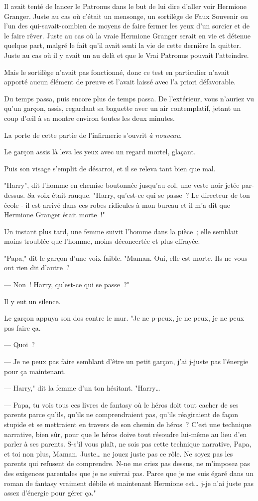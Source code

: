 Il avait tenté de lancer le Patronus dans le but de lui dire d'aller voir Hermione Granger. Juste au cas où c'était un mensonge, un sortilège de Faux Souvenir ou l'un des qui-savait-combien de moyens de faire fermer les yeux d'un sorcier et de le faire rêver. Juste au cas où la vraie Hermione Granger serait en vie et détenue quelque part, malgré le fait qu'il avait senti la vie de cette dernière la quitter. Juste au cas où il y avait un au delà et que le Vrai Patronus pouvait l'atteindre.

Mais le sortilège n'avait pas fonctionné, donc ce test en particulier n'avait apporté aucun élément de preuve et l'avait laissé avec l'a priori défavorable.

Du temps passa, puis encore plus de temps passa. De l'extérieur, vous n'auriez vu qu'un garçon, assis, regardant sa baguette avec un air contemplatif, jetant un coup d'œil à sa montre environ toutes les deux minutes.

La porte de cette partie de l'infirmerie s'ouvrit \emph{à nouveau}.

Le garçon assis là leva les yeux avec un regard mortel, glaçant.

Puis son visage s'emplit de désarroi, et il se releva tant bien que mal.

"Harry", dit l'homme en chemise boutonnée jusqu'au col, une veste noir jetée par-dessus. Sa voix était rauque. "Harry, qu'est-ce qui se passe~? Le directeur de ton école - il est arrivé dans ces robes ridicules à mon bureau et il m'a dit que Hermione Granger était morte~!"

Un instant plus tard, une femme suivit l'homme dans la pièce~; elle semblait moins troublée que l'homme, moins déconcertée et plus effrayée.

"Papa," dit le garçon d'une voix faible. "Maman. Oui, elle est morte. Ils ne vous ont rien dit d'autre~?

--- Non~! Harry, qu'est-ce qui se passe~?"

Il y eut un silence.

Le garçon appuya son dos contre le mur. "Je ne p-peux, je ne peux, je ne peux pas faire ça.

--- Quoi~?

--- Je ne peux pas faire semblant d'être un petit garçon, j'ai j-juste pas l'énergie pour ça maintenant.

--- Harry," dit la femme d'un ton hésitant. "Harry…

--- Papa, tu vois tous ces livres de fantasy où le héros doit tout cacher de ses parents parce qu'ils, qu'ils ne comprendraient pas, qu'ils réagiraient de façon stupide et se mettraient en travers de son chemin de héros~? C'est une technique narrative, bien sûr, pour que le héros doive tout résoudre lui-même au lieu d'en parler à ses parents. S-s'il vous plaît, ne sois pas cette technique narrative, Papa, et toi non plus, Maman. Juste… ne jouez juste pas ce rôle. Ne soyez pas les parents qui refusent de comprendre. N-ne me criez pas dessus, ne m'imposez pas des exigences parentales que je ne suivrai pas. Parce que je me suis égaré dans un roman de fantasy vraiment débile et maintenant Hermione est… j-je n'ai juste pas assez d'énergie pour gérer ça."


